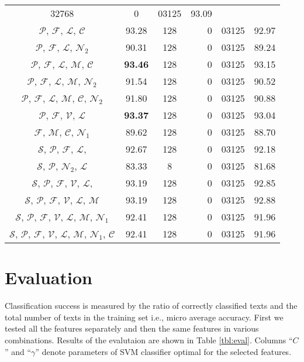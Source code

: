 \documentclass{llncs}
\begin{document}
\begin{table*}[htb]
\begin{center}
\begin{tabular}{c c c r@{.}l c}
32768 & 0 & 03125 & 93.09\\
$\mathcal{P}$, $\mathcal{F}$, $\mathcal{L}$, $\mathcal{C}$ & 93.28 &
128 & 0 & 03125 & 92.97\\
$\mathcal{P}$, $\mathcal{F}$, $\mathcal{L}$, $\mathcal{N}_2$ & 90.31 &
128 & 0 & 03125 & 89.24\\
$\mathcal{P}$, $\mathcal{F}$, $\mathcal{L}$, $\mathcal{M}$, $\mathcal{C}$ &
\textbf{93.46} & 128 & 0 & 03125 & 93.15\\
$\mathcal{P}$, $\mathcal{F}$, $\mathcal{L}$, $\mathcal{M}$, $\mathcal{N}_2$ &
91.54 & 128 & 0 & 03125 & 90.52\\
$\mathcal{P}$, $\mathcal{F}$, $\mathcal{L}$, $\mathcal{M}$, $\mathcal{C}$,
$\mathcal{N}_2$ & 91.80 & 128 & 0 & 03125 & 90.88\\
$\mathcal{P}$, $\mathcal{F}$, $\mathcal{V}$, $\mathcal{L}$ & \textbf{93.37} &
128 & 0 & 03125 & 93.04\\
$\mathcal{F}$, $\mathcal{M}$, $\mathcal{C}$, $\mathcal{N}_1$ & 89.62 & 128 & 0
& 03125 & 88.70\\
$\mathcal{S}$, $\mathcal{P}$, $\mathcal{F}$, $\mathcal{L}$, & 92.67 & 128 & 0 &
03125 & 92.18\\
$\mathcal{S}$, $\mathcal{P}$, $\mathcal{N}_2$, $\mathcal{L}$ & 83.33 & 8 & 0 &
03125 & 81.68\\
$\mathcal{S}$, $\mathcal{P}$, $\mathcal{F}$, $\mathcal{V}$, $\mathcal{L}$, &
93.19 & 128 & 0 & 03125 & 92.85\\
$\mathcal{S}$, $\mathcal{P}$, $\mathcal{F}$, $\mathcal{V}$, $\mathcal{L}$,
$\mathcal{M}$ & 93.19 & 128 & 0 & 03125 & 92.88\\
$\mathcal{S}$, $\mathcal{P}$, $\mathcal{F}$, $\mathcal{V}$,
$\mathcal{L}$, $\mathcal{M}$, $\mathcal{N}_1$ & 92.41 & 128 & 0 & 03125 & 91.96\\
$\mathcal{S}$, $\mathcal{P}$, $\mathcal{F}$, $\mathcal{V}$, $\mathcal{L}$,
$\mathcal{M}$, $\mathcal{N}_1$, $\mathcal{C}$ & 92.41 & 128 & 0 & 03125 &
91.96\\
\bottomrule
\end{tabular}
\label{tbl:eval}
\end{center}
\end{table*}

\section{Evaluation}
\label{sec:evaluacija}
Classification success is measured by the ratio of correctly classified texts and
the total number of texts in the training set i.e., micro average accuracy.
First we tested all the features separately and then the same features in
various combinations. Results of the evalutaion
are shown in Table \ref{tbl:eval}. Columns ``$C$'' and ``$\gamma$'' denote
parameters of SVM classifier optimal for the selected features.
\end{document}

